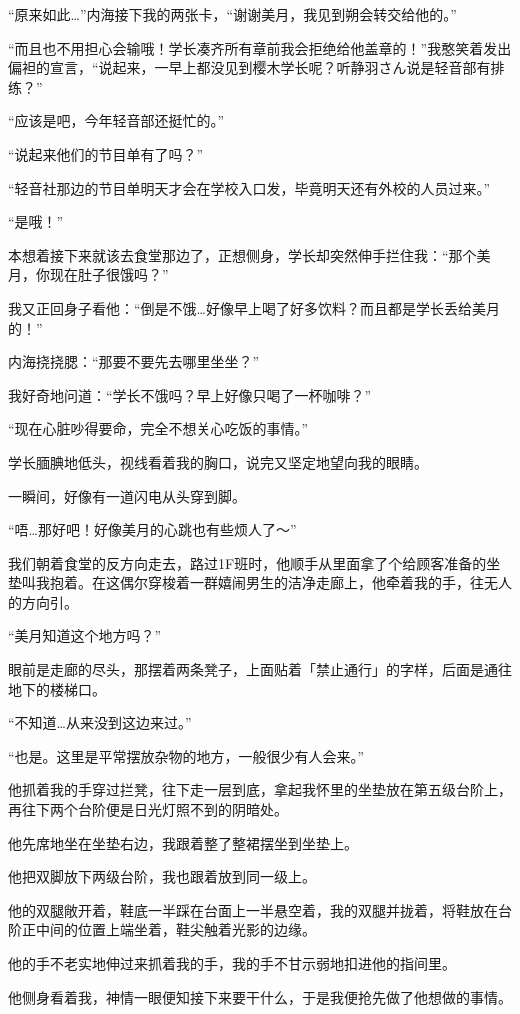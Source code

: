 “原来如此…”内海接下我的两张卡，“谢谢美月，我见到朔会转交给他的。”

“而且也不用担心会输哦！学长凑齐所有章前我会拒绝给他盖章的！”我憨笑着发出偏袒的宣言，“说起来，一早上都没见到樱木学长呢？听静羽さん说是轻音部有排练？”

“应该是吧，今年轻音部还挺忙的。”

“说起来他们的节目单有了吗？”

“轻音社那边的节目单明天才会在学校入口发，毕竟明天还有外校的人员过来。”

“是哦！”

本想着接下来就该去食堂那边了，正想侧身，学长却突然伸手拦住我：“那个美月，你现在肚子很饿吗？”

我又正回身子看他：“倒是不饿…好像早上喝了好多饮料？而且都是学长丢给美月的！”

内海挠挠腮：“那要不要先去哪里坐坐？”

我好奇地问道：“学长不饿吗？早上好像只喝了一杯咖啡？”

“现在心脏吵得要命，完全不想关心吃饭的事情。”

学长腼腆地低头，视线看着我的胸口，说完又坚定地望向我的眼睛。

一瞬间，好像有一道闪电从头穿到脚。

“唔…那好吧！好像美月的心跳也有些烦人了～”

我们朝着食堂的反方向走去，路过1F班时，他顺手从里面拿了个给顾客准备的坐垫叫我抱着。在这偶尔穿梭着一群嬉闹男生的洁净走廊上，他牵着我的手，往无人的方向引。

\cutlinef{\heartsmile}

“美月知道这个地方吗？”

眼前是走廊的尽头，那摆着两条凳子，上面贴着「禁止通行\forbidden」的字样，后面是通往地下的楼梯口。

“不知道…从来没到这边来过。”

“也是。这里是平常摆放杂物的地方，一般很少有人会来。”

他抓着我的手穿过拦凳，往下走一层到底，拿起我怀里的坐垫放在第五级台阶上，再往下两个台阶便是日光灯照不到的阴暗处。

他先席地坐在坐垫右边，我跟着整了整裙摆坐到坐垫上。

他把双脚放下两级台阶，我也跟着放到同一级上。

他的双腿敞开着，鞋底一半踩在台面上一半悬空着，我的双腿并拢着，将鞋放在台阶正中间的位置上端坐着，鞋尖触着光影的边缘。

他的手不老实地伸过来抓着我的手，我的手不甘示弱地扣进他的指间里。

他侧身看着我，神情一眼便知接下来要干什么，于是我便抢先做了他想做的事情。

